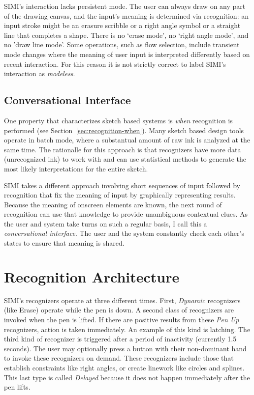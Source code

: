 SIMI's interaction lacks persistent mode. The user can always draw on
any part of the drawing canvas, and the input's meaning is determined
via recognition: an input stroke might be an erasure scribble or a
right angle symbol or a straight line that completes a shape. There is
no `erase mode', no `right angle mode', and no 'draw line mode'. Some
operations, such as flow selection, include transient mode changes
where the meaning of user input is interpreted differently based on
recent interaction. For this reason it is not strictly correct to
label SIMI's interaction as \textit{modeless}.

\subsection{Conversational Interface}

One property that characterizes sketch based systems is \textit{when}
recognition is performed (see
Section~\ref{sec:recognition-when}). Many sketch based design tools
operate in batch mode, where a substantual amount of raw ink is
analyzed at the same time. The rationalle for this approach is that
recognizers have more data (unrecognized ink) to work with and can use
statistical methods to generate the most likely interpretations for
the entire sketch.

SIMI takes a different approach involving short sequences of input
followed by recognition that fix the meaning of input by graphically
representing results. Because the meaning of onscreen elements are
known, the next round of recognition can use that knowledge to provide
unambiguous contextual clues. As the user and system take turns on
such a regular basis, I call this a \textit{conversational
  interface}. The user and the system constantly check each other's
states to ensure that meaning is shared.

\section{Recognition Architecture}

SIMI's recognizers operate at three different times. First,
\textit{Dynamic} recognizers (like Erase) operate while the pen is
down. A second class of recognizers are invoked when the pen is
lifted. If there are positive results from these \textit{Pen Up}
recognizers, action is taken immediately. An example of this kind is
latching. The third kind of recognizer is triggered after a period of
inactivity (currently 1.5 seconds). The user may optionally press a
button with their non-dominant hand to invoke these recognizers on
demand. These recognizers include those that establish constraints
like right angles, or create linework like circles and splines. This
last type is called \textit{Delayed} because it does not happen
immediately after the pen lifts.

